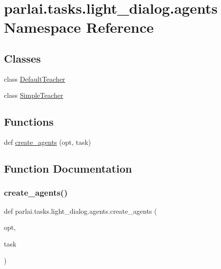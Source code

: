 \hypertarget{namespaceparlai_1_1tasks_1_1light__dialog_1_1agents}{}\section{parlai.\+tasks.\+light\+\_\+dialog.\+agents Namespace Reference}
\label{namespaceparlai_1_1tasks_1_1light__dialog_1_1agents}
\subsection*{Classes}
\begin{DoxyCompactItemize}
\item 
class \hyperlink{classparlai_1_1tasks_1_1light__dialog_1_1agents_1_1DefaultTeacher}{Default\+Teacher}
\item 
class \hyperlink{classparlai_1_1tasks_1_1light__dialog_1_1agents_1_1SimpleTeacher}{Simple\+Teacher}
\end{DoxyCompactItemize}
\subsection*{Functions}
\begin{DoxyCompactItemize}
\item 
def \hyperlink{namespaceparlai_1_1tasks_1_1light__dialog_1_1agents_ad302d417b1eeaa0667e8353437153d7f}{create\+\_\+agents} (opt, task)
\end{DoxyCompactItemize}


\subsection{Function Documentation}
\mbox{\label{namespaceparlai_1_1tasks_1_1light__dialog_1_1agents_ad302d417b1eeaa0667e8353437153d7f}} 
\subsubsection{\texorpdfstring{create\+\_\+agents()}{create\_agents()}}
{\footnotesize\ttfamily def parlai.\+tasks.\+light\+\_\+dialog.\+agents.\+create\+\_\+agents (\begin{DoxyParamCaption}\item[{}]{opt,  }\item[{}]{task }\end{DoxyParamCaption})}



